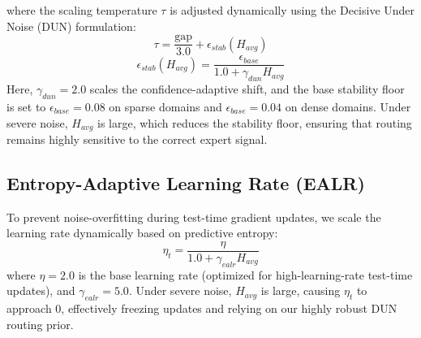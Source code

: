 \documentclass{article}
\theoremstyle{plain}
\theoremstyle{definition}
\theoremstyle{remark}
\begin{document}
where the scaling temperature $\tau$ is adjusted dynamically using the Decisive Under Noise (DUN) formulation:
\begin{equation}
  \tau = \frac{\text{gap}}{3.0} + \epsilon_{stab}(H_{avg})
\end{equation}
\begin{equation}
  \epsilon_{stab}(H_{avg}) = \frac{\epsilon_{base}}{1.0 + \gamma_{dun} H_{avg}}
\end{equation}
Here, $\gamma_{dun} = 2.0$ scales the confidence-adaptive shift, and the base stability floor is set to $\epsilon_{base} = 0.08$ on sparse domains and $\epsilon_{base} = 0.04$ on dense domains. Under severe noise, $H_{avg}$ is large, which reduces the stability floor, ensuring that routing remains highly sensitive to the correct expert signal.

\subsection{Entropy-Adaptive Learning Rate (EALR)}
To prevent noise-overfitting during test-time gradient updates, we scale the learning rate dynamically based on predictive entropy:
\begin{equation}
  \eta_t = \frac{\eta}{1.0 + \gamma_{ealr} H_{avg}}
  \label{ealr-eq}
\end{equation}
where $\eta = 2.0$ is the base learning rate (optimized for high-learning-rate test-time updates), and $\gamma_{ealr} = 5.0$. Under severe noise, $H_{avg}$ is large, causing $\eta_t$ to approach 0, effectively freezing updates and relying on our highly robust DUN routing prior.
\end{document}
